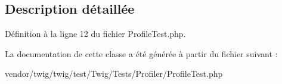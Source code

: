 \subsection{Description détaillée}


Définition à la ligne 12 du fichier Profile\+Test.\+php.



La documentation de cette classe a été générée à partir du fichier suivant \+:\begin{DoxyCompactItemize}
\item 
vendor/twig/twig/test/\+Twig/\+Tests/\+Profiler/Profile\+Test.\+php\end{DoxyCompactItemize}
